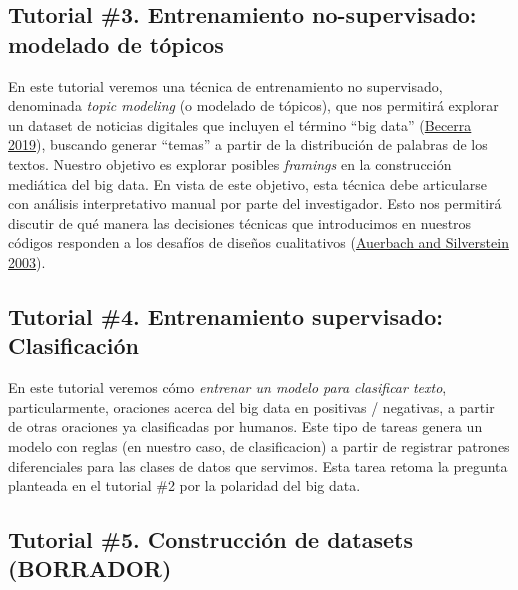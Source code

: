 \documentclass[
]{book}
\begin{document}
\hypertarget{tutorial-3.-entrenamiento-no-supervisado-modelado-de-tuxf3picos}{%
\subsection*{Tutorial \#3. Entrenamiento no-supervisado: modelado de tópicos}\label{tutorial-3.-entrenamiento-no-supervisado-modelado-de-tuxf3picos}}

En este tutorial veremos una técnica de entrenamiento no supervisado, denominada \emph{topic modeling} (o modelado de tópicos), que nos permitirá explorar un dataset de noticias digitales que incluyen el término ``big data'' (\protect\hyperlink{ref-Becerra2019}{Becerra 2019}), buscando generar ``temas'' a partir de la distribución de palabras de los textos. Nuestro objetivo es explorar posibles \emph{framings} en la construcción mediática del big data. En vista de este objetivo, esta técnica debe articularse con análisis interpretativo manual por parte del investigador. Esto nos permitirá discutir de qué manera las decisiones técnicas que introducimos en nuestros códigos responden a los desafíos de diseños cualitativos (\protect\hyperlink{ref-Auerbach2003}{Auerbach and Silverstein 2003}).

\hypertarget{tutorial-4.-entrenamiento-supervisado-clasificaciuxf3n}{%
\subsection*{Tutorial \#4. Entrenamiento supervisado: Clasificación}\label{tutorial-4.-entrenamiento-supervisado-clasificaciuxf3n}}

En este tutorial veremos cómo \emph{entrenar un modelo para clasificar texto}, particularmente, oraciones acerca del big data en positivas / negativas, a partir de otras oraciones ya clasificadas por humanos. Este tipo de tareas genera un modelo con reglas (en nuestro caso, de clasificacion) a partir de registrar patrones diferenciales para las clases de datos que servimos. Esta tarea retoma la pregunta planteada en el tutorial \#2 por la polaridad del big data.

\hypertarget{tutorial-5.-construcciuxf3n-de-datasets-borrador}{%
\subsection*{Tutorial \#5. Construcción de datasets (BORRADOR)}\label{tutorial-5.-construcciuxf3n-de-datasets-borrador}}
\end{document}
